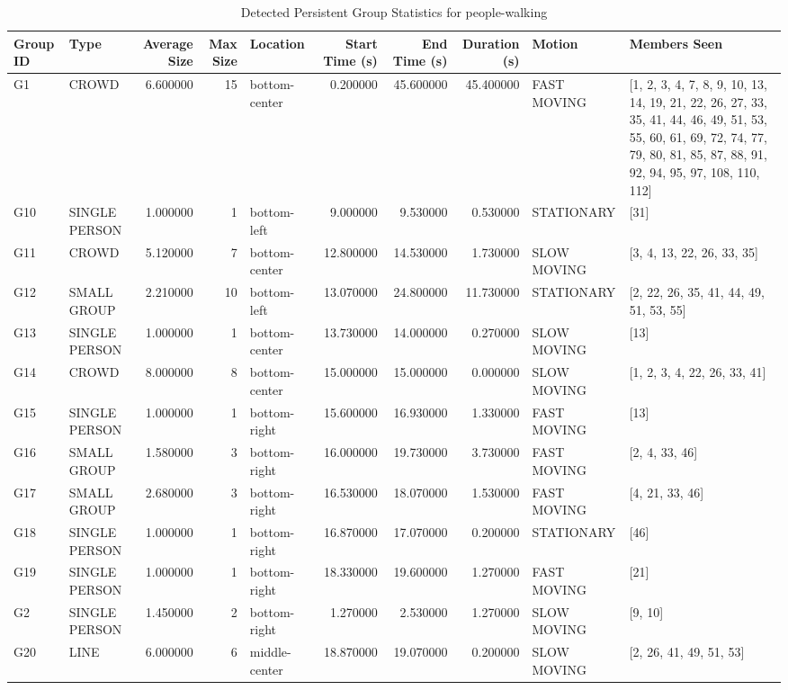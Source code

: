 \begin{table}
\caption{Detected Persistent Group Statistics for people-walking}
\label{tab:people-walking_group_statistics}
\begin{tabular}{llrrlrrrll}
\toprule
Group ID & Type & Average Size & Max Size & Location & Start Time (s) & End Time (s) & Duration (s) & Motion & Members Seen \\
\midrule
G1 & CROWD & 6.600000 & 15 & bottom-center & 0.200000 & 45.600000 & 45.400000 & FAST MOVING & [1, 2, 3, 4, 7, 8, 9, 10, 13, 14, 19, 21, 22, 26, 27, 33, 35, 41, 44, 46, 49, 51, 53, 55, 60, 61, 69, 72, 74, 77, 79, 80, 81, 85, 87, 88, 91, 92, 94, 95, 97, 108, 110, 112] \\
G10 & SINGLE PERSON & 1.000000 & 1 & bottom-left & 9.000000 & 9.530000 & 0.530000 & STATIONARY & [31] \\
G11 & CROWD & 5.120000 & 7 & bottom-center & 12.800000 & 14.530000 & 1.730000 & SLOW MOVING & [3, 4, 13, 22, 26, 33, 35] \\
G12 & SMALL GROUP & 2.210000 & 10 & bottom-left & 13.070000 & 24.800000 & 11.730000 & STATIONARY & [2, 22, 26, 35, 41, 44, 49, 51, 53, 55] \\
G13 & SINGLE PERSON & 1.000000 & 1 & bottom-center & 13.730000 & 14.000000 & 0.270000 & SLOW MOVING & [13] \\
G14 & CROWD & 8.000000 & 8 & bottom-center & 15.000000 & 15.000000 & 0.000000 & SLOW MOVING & [1, 2, 3, 4, 22, 26, 33, 41] \\
G15 & SINGLE PERSON & 1.000000 & 1 & bottom-right & 15.600000 & 16.930000 & 1.330000 & FAST MOVING & [13] \\
G16 & SMALL GROUP & 1.580000 & 3 & bottom-right & 16.000000 & 19.730000 & 3.730000 & FAST MOVING & [2, 4, 33, 46] \\
G17 & SMALL GROUP & 2.680000 & 3 & bottom-right & 16.530000 & 18.070000 & 1.530000 & FAST MOVING & [4, 21, 33, 46] \\
G18 & SINGLE PERSON & 1.000000 & 1 & bottom-right & 16.870000 & 17.070000 & 0.200000 & STATIONARY & [46] \\
G19 & SINGLE PERSON & 1.000000 & 1 & bottom-right & 18.330000 & 19.600000 & 1.270000 & FAST MOVING & [21] \\
G2 & SINGLE PERSON & 1.450000 & 2 & bottom-right & 1.270000 & 2.530000 & 1.270000 & SLOW MOVING & [9, 10] \\
G20 & LINE & 6.000000 & 6 & middle-center & 18.870000 & 19.070000 & 0.200000 & SLOW MOVING & [2, 26, 41, 49, 51, 53] \\

\end{tabular}
\end{table}

